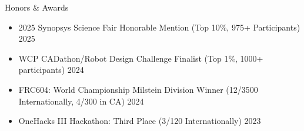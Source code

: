 \documentclass[
  10pt, %
]{resume}
\begin{document}
\begin{rSection}{Honors \& Awards}

  \begin{itemize}
      \setlength\itemsep{-0.7em} %
        
      \item 2025 Synopsys Science Fair Honorable Mention (Top 10\%, 975+ Participants) \hfill 2025
              
      \item WCP CADathon/Robot Design Challenge Finalist (Top 1\%, 1000+ participants) \hfill 2024
              
      \item FRC604: World Championship Milstein Division Winner (12/3500 Internationally, 4/300 in CA) \hfill 2024
              
      \item OneHacks III Hackathon: Third Place (3/120 Internationally) \hfill 2023
              


    \end{itemize}

\end{rSection}
\end{document}

